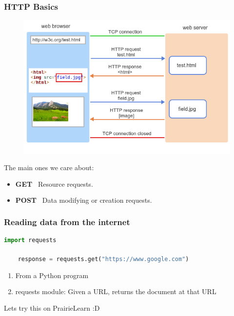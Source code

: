 \documentclass{beamer}
\begin{document}
%
%
\begin{frame}[fragile]
    \frametitle{HTTP Basics}
    \begin{minipage}{0.49\textwidth}
        \begin{figure}
            \includegraphics[width=\textwidth]{./imgs/httprequest.png}
        \end{figure}
    \end{minipage}
    \begin{minipage}{0.49\textwidth}
        The main ones we care about:
        \begin{itemize}
            \item \textbf{GET} \textrightarrow \ Resource requests.
            \item \textbf{POST} \textrightarrow \ Data modifying or creation requests.
        \end{itemize}
    \end{minipage}
\end{frame}

%
%
\begin{frame}[fragile]
    \frametitle{Reading data from the internet}
    \begin{lstlisting}[language=Python, autogobble]
    import requests

    response = requests.get("https://www.google.com")
    \end{lstlisting} 
    \vfill
    \begin{enumerate}[A]
        \item From a Python program
        \item requests module: Given a URL, returns the document at that URL
    \end{enumerate}
    \pause
    Lets try this on PrairieLearn :D 
\end{frame}
\end{document}
